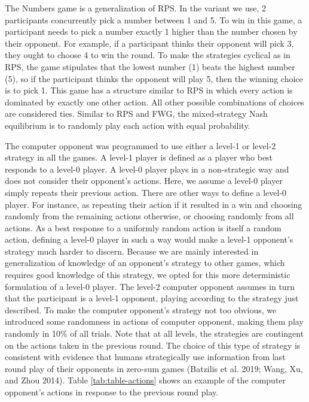 \documentclass[smallextended]{svjour3}       %
\begin{document}
The Numbers game is a generalization of RPS. In the variant we use, 2
participants concurrently pick a number between 1 and 5. To win in this
game, a participant needs to pick a number exactly 1 higher than the
number chosen by their opponent. For example, if a participant thinks
their opponent will pick 3, they ought to choose 4 to win the round. To
make the strategies cyclical as in RPS, the game stipulates that the
lowest number (1) beats the highest number (5), so if the participant
thinks the opponent will play 5, then the winning choice is to pick 1.
This game has a structure similar to RPS in which every action is
dominated by exactly one other action. All other possible combinations
of choices are considered ties. Similar to RPS and FWG, the
mixed-strategy Nash equilibrium is to randomly play each action with
equal probability.

The computer opponent was programmed to use either a level-1 or level-2
strategy in all the games. A level-1 player is defined as a player who
best responds to a level-0 player. A level-0 player plays in a
non-strategic way and does not consider their opponent's actions. Here,
we assume a level-0 player simply repeats their previous action. There
are other ways to define a level-0 player. For instance, as repeating
their action if it resulted in a win and choosing randomly from the
remaining actions otherwise, or choosing randomly from all actions. As a
best response to a uniformly random action is itself a random action,
defining a level-0 player in such a way would make a level-1 opponent's
strategy much harder to discern. Because we are mainly interested in
generalization of knowledge of an opponent's strategy to other games,
which requires good knowledge of this strategy, we opted for this more
deterministic formulation of a level-0 player. The level-2 computer
opponent assumes in turn that the participant is a level-1 opponent,
playing according to the strategy just described. To make the computer
opponent's strategy not too obvious, we introduced some randomness in
actions of computer opponent, making them play randomly in 10\% of all
trials. Note that at all levels, the strategies are contingent on the
actions taken in the previous round. The choice of this type of strategy
is consistent with evidence that humans strategically use information
from last round play of their opponents in zero-sum games (Batzilis et
al. 2019; Wang, Xu, and Zhou 2014). Table \ref{tab:table-actions} shows
an example of the computer opponent's actions in response to the
previous round play.
\end{document}
